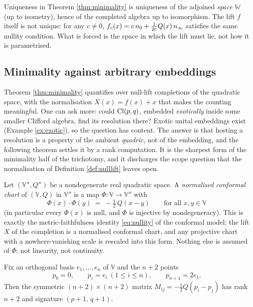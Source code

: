 \begin{remark}\label{rem:whatunique}
Uniqueness in Theorem \ref{thm:minimality} is uniqueness of the adjoined \emph{space} $\mathbb{W}$ (up to isometry), hence of the completed algebra up to isomorphism. The lift $f$ itself is not unique: for any $c \neq 0$, $f_c(x) = c\,n_0 + \tfrac{1}{2c} Q(x)\,n_\infty$ satisfies the same nullity condition. What is forced is the space in which the lift must lie, not how it is parametrised.
\end{remark}

\subsection{Minimality against arbitrary embeddings}\label{subsec:chartmin}

Theorem \ref{thm:minimality} quantifies over null-lift completions of the quadratic space, with the normalisation $X(x) = f(x) + x$ that makes the counting meaningful. One can ask more: could $\mathrm{Cl}(p,q)$, embedded \emph{exotically} inside some smaller Clifford algebra, find its resolution there? Exotic unital embeddings exist (Example \ref{ex:exotic}), so the question has content. The answer is that hosting a resolution is a property of the ambient \emph{quadric}, not of the embedding, and the following theorem settles it by a rank computation. It is the sharpest form of the minimality half of the trichotomy, and it discharges the scope question that the normalisation of Definition \ref{def:nulllift} leaves open.

\begin{definition}\label{def:chart}
Let $(\mathbb{V}'', Q'')$ be a nondegenerate real quadratic space. A \emph{normalised conformal chart} of $(\mathbb{V}, Q)$ in $\mathbb{V}''$ is a map $\Phi : \mathbb{V} \to \mathbb{V}''$ with
\[
\Phi(x) \cdot \Phi(y) \;=\; -\tfrac12\, Q(x - y) \qquad \text{for all } x, y \in \mathbb{V}
\]
(in particular every $\Phi(x)$ is null, and $\Phi$ is injective by nondegeneracy). This is exactly the metric-faithfulness identity \eqref{eq:nullity} of the conformal model; the lift $X$ of the completion is a normalised conformal chart, and any projective chart with a nowhere-vanishing scale is rescaled into this form. Nothing else is assumed of $\Phi$: not linearity, not continuity.
\end{definition}

\begin{lemma}\label{lem:gram}
Fix an orthogonal basis $e_1, \dots, e_n$ of $\mathbb{V}$ and the $n + 2$ points
\[
p_0 = 0, \qquad p_i = e_i \ (1 \leq i \leq n), \qquad p_{n+1} = 2e_1 .
\]
Then the symmetric $(n{+}2) \times (n{+}2)$ matrix $M_{ij} = -\tfrac12 Q(p_i - p_j)$ has rank $n + 2$ and signature $(p{+}1,\, q{+}1)$.
\end{lemma}

